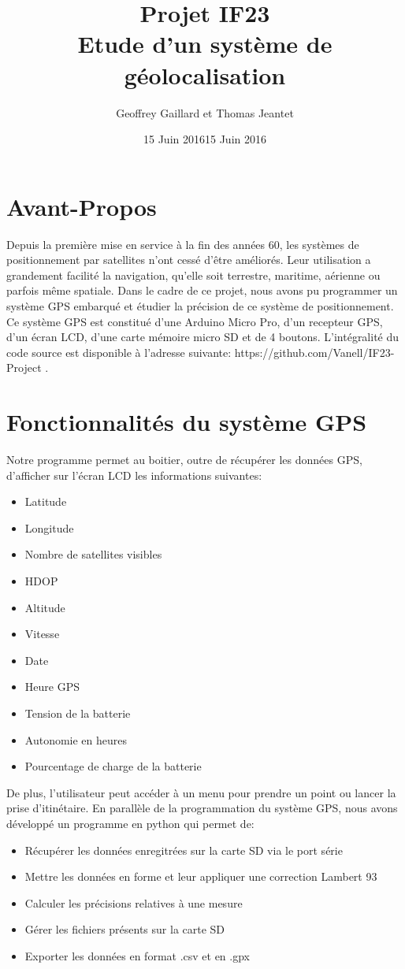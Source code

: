 \documentclass[a4paper,12pt]{article}
\author{Geoffrey Gaillard et Thomas Jeantet}
\date{15 Juin 2016}
\title{Projet IF23\\Etude d'un système de géolocalisation}
\date{15 Juin 2016}
\begin{document}
\maketitle
\newpage
\tableofcontents
\newpage


\section*{Avant-Propos}
Depuis la première mise en service à la fin des années 60, les systèmes de positionnement par satellites n'ont cessé d'être améliorés. Leur utilisation a grandement facilité la navigation, qu'elle soit terrestre, maritime, aérienne ou parfois même spatiale. Dans le cadre de ce projet, nous avons pu programmer un système GPS embarqué et étudier la précision de ce système de positionnement. Ce système GPS est constitué d'une Arduino Micro Pro, d'un recepteur GPS, d'un écran LCD, d'une carte mémoire micro SD et de 4 boutons. L'intégralité du code source est disponible à l'adresse suivante: https://github.com/Vanell/IF23-Project .
\section{Fonctionnalités du système GPS}
Notre programme permet au boitier, outre de récupérer les données GPS, d'afficher sur l'écran LCD les informations suivantes:
\begin{itemize}
\item Latitude
\item Longitude
\item Nombre de satellites visibles
\item HDOP
\item Altitude
\item Vitesse
\item Date
\item Heure GPS
\item Tension de la batterie
\item Autonomie en heures
\item Pourcentage de charge de la batterie

\end{itemize}

De plus, l'utilisateur peut accéder à un menu pour prendre un point ou lancer la prise d'itinétaire.
En parallèle de la programmation du système GPS, nous avons développé un programme en python qui permet de:
\begin{itemize}
\item Récupérer les données enregitrées sur la carte SD via le port série
\item Mettre les données en forme et leur appliquer une correction Lambert 93
\item Calculer les précisions relatives à une mesure
\item Gérer les fichiers présents sur la carte SD
\item Exporter les données en format .csv et en .gpx

\end{itemize}
\newpage
\end{document}
